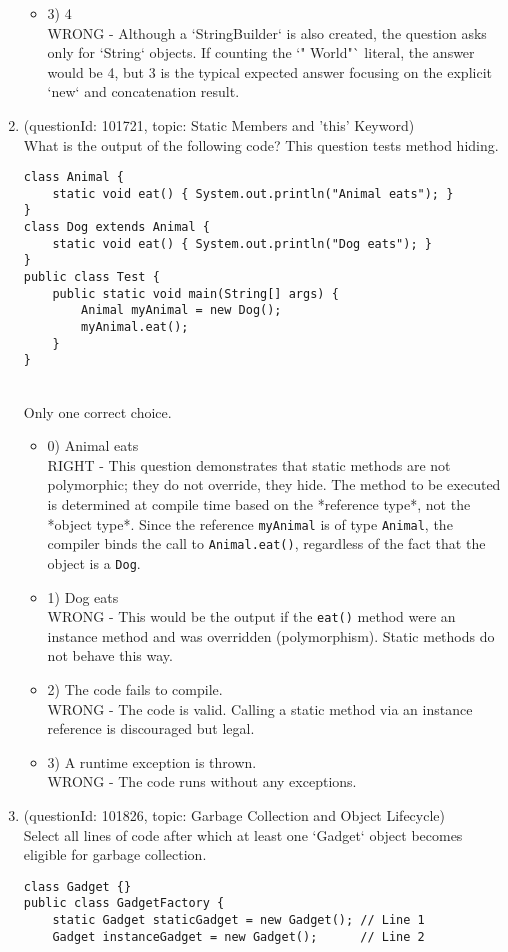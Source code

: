 \documentclass[12pt]{article}
\begin{document}
\begin{enumerate}[label=(\arabic*)]
\begin{itemize}
\item 3) 4
 \\ 
WRONG - Although a `StringBuilder` is also created, the question asks only for `String` objects. If counting the `" World"` literal, the answer would be 4, but 3 is the typical expected answer focusing on the explicit `new` and concatenation result.

\end{itemize}
\item (questionId: 101721, topic: Static Members and 'this' Keyword) \\ 
What is the output of the following code? This question tests method hiding.\n\begin{verbatim}
class Animal {
    static void eat() { System.out.println("Animal eats"); }
}
class Dog extends Animal {
    static void eat() { System.out.println("Dog eats"); }
}
public class Test {
    public static void main(String[] args) {
        Animal myAnimal = new Dog();
        myAnimal.eat();
    }
}
\end{verbatim}
\\ \noindent Only one correct choice. 
\begin{itemize}
\item 0) Animal eats
 \\ 
RIGHT - This question demonstrates that static methods are not polymorphic; they do not override, they hide. The method to be executed is determined at compile time based on the *reference type*, not the *object type*. Since the reference \verb|myAnimal| is of type \verb|Animal|, the compiler binds the call to \verb|Animal.eat()|, regardless of the fact that the object is a \verb|Dog|.

\item 1) Dog eats
 \\ 
WRONG - This would be the output if the \verb|eat()| method were an instance method and was overridden (polymorphism). Static methods do not behave this way.

\item 2) The code fails to compile.
 \\ 
WRONG - The code is valid. Calling a static method via an instance reference is discouraged but legal.

\item 3) A runtime exception is thrown.
 \\ 
WRONG - The code runs without any exceptions.

\end{itemize}
\item (questionId: 101826, topic: Garbage Collection and Object Lifecycle) \\ 
Select all lines of code after which at least one `Gadget` object becomes eligible for garbage collection.
\begin{verbatim}
class Gadget {}
public class GadgetFactory {
    static Gadget staticGadget = new Gadget(); // Line 1
    Gadget instanceGadget = new Gadget();      // Line 2


\end{verbatim}
\end{enumerate}
\end{document}
